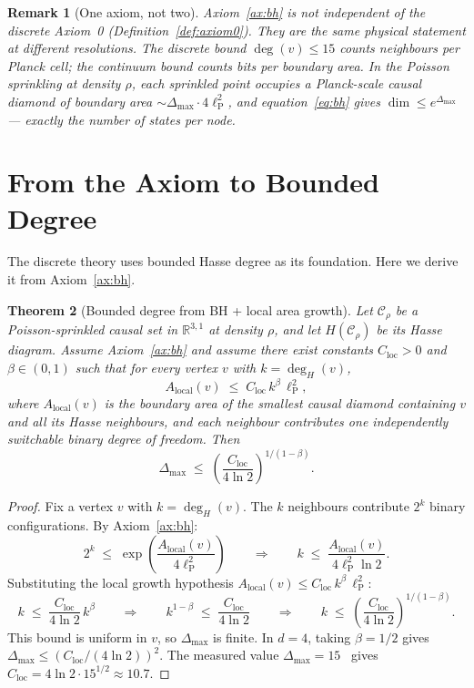\documentclass[11pt]{article}
\newtheorem{theorem}{Theorem}[section]
\newtheorem{remark}[theorem]{Remark}
\newcommand{\lP}{\ell_{\mathrm{P}}}
\begin{document}
\begin{remark}[One axiom, not two]
\label{rem:one-axiom}
Axiom~\ref{ax:bh} is not independent of the discrete
Axiom~0 (Definition~\ref{def:axiom0}).  They are the same
physical statement at different
resolutions.  The discrete bound $\deg(v) \le 15$ counts
neighbours per Planck cell; the continuum bound counts
bits per boundary area.  In the Poisson sprinkling at
density $\rho$, each sprinkled point occupies a Planck-scale
causal diamond of boundary area $\sim \Delta_{\max} \cdot
4\lP^2$, and equation~\eqref{eq:bh} gives
$\dim \le e^{\Delta_{\max}}$ --- exactly the number of
states per node.
\end{remark}

\section{From the Axiom to Bounded Degree}
\label{sec:bounded-degree}

The discrete theory uses bounded Hasse degree as its
foundation.  Here we derive it from Axiom~\ref{ax:bh}.

\begin{theorem}[Bounded degree from BH + local area growth]
\label{thm:bounded-degree}
Let $\mathcal{C}_\rho$ be a Poisson-sprinkled causal set in
$\mathbb{R}^{3,1}$ at density $\rho$, and let $H(\mathcal{C}_\rho)$
be its Hasse diagram.  Assume Axiom~\ref{ax:bh} and assume
there exist constants $C_{\mathrm{loc}} > 0$ and
$\beta \in (0,1)$ such that for every vertex $v$ with
$k = \deg_H(v)$,
\[
  A_{\mathrm{local}}(v)
  \;\le\; C_{\mathrm{loc}}\, k^\beta\, \lP^2,
\]
where $A_{\mathrm{local}}(v)$ is the boundary area of the
smallest causal diamond containing $v$ and all its Hasse
neighbours, and each neighbour contributes one independently
switchable binary degree of freedom.  Then
\[
  \Delta_{\max}
  \;\le\;
  \left(\frac{C_{\mathrm{loc}}}{4\ln 2}\right)^{\!1/(1-\beta)}.
\]
\end{theorem}

\begin{proof}
Fix a vertex $v$ with $k = \deg_H(v)$.  The $k$ neighbours
contribute $2^k$ binary configurations.  By
Axiom~\ref{ax:bh}:
\[
  2^k \;\le\; \exp\!\left(
    \frac{A_{\mathrm{local}}(v)}{4\lP^2}
  \right)
  \qquad\Longrightarrow\qquad
  k \;\le\; \frac{A_{\mathrm{local}}(v)}{4\lP^2 \ln 2}.
\]
Substituting the local growth hypothesis
$A_{\mathrm{local}}(v) \le C_{\mathrm{loc}}\, k^\beta\, \lP^2$:
\[
  k \;\le\; \frac{C_{\mathrm{loc}}}{4\ln 2}\, k^\beta
  \qquad\Longrightarrow\qquad
  k^{1-\beta} \;\le\; \frac{C_{\mathrm{loc}}}{4\ln 2}
  \qquad\Longrightarrow\qquad
  k \;\le\;
  \left(\frac{C_{\mathrm{loc}}}{4\ln 2}\right)^{\!1/(1-\beta)}.
\]
This bound is uniform in $v$, so $\Delta_{\max}$ is finite.
In $d = 4$, taking $\beta = 1/2$ gives
$\Delta_{\max} \le (C_{\mathrm{loc}}/(4\ln 2))^2$.
The measured value $\Delta_{\max} = 15$~\cite{SilvaAlvarado26}
gives $C_{\mathrm{loc}} = 4\ln 2 \cdot 15^{1/2} \approx 10.7$.
\end{proof}
\end{document}
